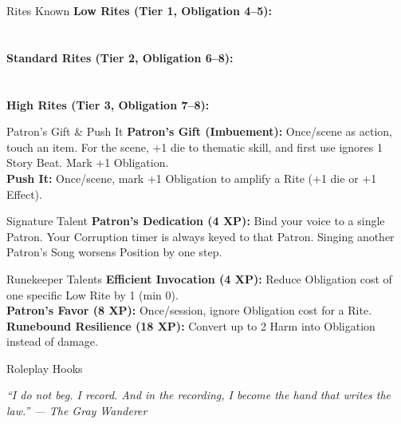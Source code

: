 \documentclass[10pt]{article}
\begin{document}
\begin{minipage}[t]{0.48\linewidth}
    \begin{charbox}{Rites Known}
        \textbf{Low Rites (Tier 1, Obligation 4--5):}\\
        \underline{\hspace{7cm}}\\
        \underline{\hspace{7cm}}\\
        \textbf{Standard Rites (Tier 2, Obligation 6--8):}\\
        \underline{\hspace{7cm}}\\
        \underline{\hspace{7cm}}\\
        \textbf{High Rites (Tier 3, Obligation 7--8):}\\
        \underline{\hspace{7cm}}
    \end{charbox}
    
    \vspace{0.5em}
    
    \begin{charbox}{Patron's Gift \& Push It}
        \textbf{Patron's Gift (Imbuement):} Once/scene as action, touch an item. For the scene, +1 die to thematic skill, and first use ignores 1 Story Beat. Mark +1 Obligation.\\
        \textbf{Push It:} Once/scene, mark +1 Obligation to amplify a Rite (+1 die or +1 Effect).
    \end{charbox}
    
    \vspace{0.5em}
    
    \begin{charbox}{Signature Talent}
        \textbf{Patron's Dedication (4 XP):} Bind your voice to a single Patron. Your Corruption timer is always keyed to that Patron. Singing another Patron's Song worsens Position by one step.
    \end{charbox}
    
    \vspace{0.5em}
    
    \begin{charbox}{Runekeeper Talents}
        \textbf{Efficient Invocation (4 XP):} Reduce Obligation cost of one specific Low Rite by 1 (min 0).\\
        \textbf{Patron's Favor (8 XP):} Once/session, ignore Obligation cost for a Rite.\\
        \textbf{Runebound Resilience (18 XP):} Convert up to 2 Harm into Obligation instead of damage.
    \end{charbox}
    
    \vspace{0.5em}
    
    \begin{charbox}{Roleplay Hooks}
        \underline{\hspace{7cm}}\\
        \underline{\hspace{7cm}}
    \end{charbox}
\end{minipage}

\vspace{1em}
\begin{center}
    {\small\sffamily\itshape ``I do not beg. I record. And in the recording, I become the hand that writes the law.'' --- The Gray Wanderer}
\end{center}
\end{document}
